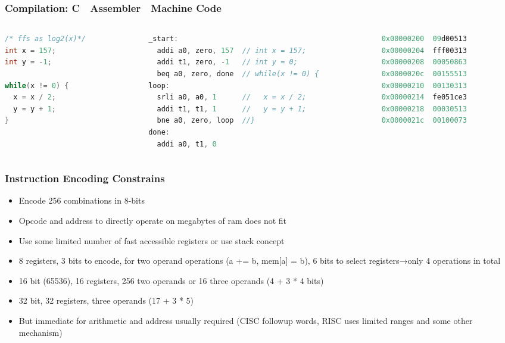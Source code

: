 \documentclass{beamer}
\begin{document}
\begin{frame}[fragile]
\frametitle{Compilation: C  Assembler  Machine Code}

\begin{columns}
\begin{column}{0.3\textwidth}
\begin{lstlisting}[language={C},columns=flexible]
/* ffs as log2(x)*/
int x = 157;
int y = -1;
 
while(x != 0) {
  x = x / 2;
  y = y + 1;
}
\end{lstlisting}
\end{column}

\begin{column}{0.4\textwidth}  
\begin{lstlisting}[language={C},columns=flexible]
_start:
  addi a0, zero, 157  // int x = 157;
  addi t1, zero, -1   // int y = 0;
  beq a0, zero, done  // while(x != 0) {
loop:
  srli a0, a0, 1      //   x = x / 2;
  addi t1, t1, 1      //   y = y + 1;
  bne a0, zero, loop  //}
done:
  addi a0, t1, 0
\end{lstlisting}
\end{column}

\begin{column}{0.3\textwidth}  
\begin{lstlisting}[language={C}]
0x00000200  09d00513
0x00000204  fff00313
0x00000208  00050863
0x0000020c  00155513
0x00000210  00130313
0x00000214  fe051ce3
0x00000218  00030513
0x0000021c  00100073
\end{lstlisting}
\end{column}

\end{columns}

\end{frame}


\begin{frame}
\frametitle{Instruction Encoding Constrains}
\begin{itemize}
\item Encode 256 combinations in 8-bits
\item Opcode and address to directly operate on megabytes of ram does not fit
\item Use some limited number of fast accessible registers or use stack concept
\item 8 registers, 3 bits to encode, for two operand operations (a += b, mem[a] = b), 6 bits to select registers→only 4 operations in total
\item 16 bit (65536), 16 registers, 256 two operands or 16 three operands (4 + 3 * 4 bits)
\item 32 bit, 32 registers, three operands (17 + 3 * 5)
\item But immediate for arithmetic and address usually required (CISC followup words, RISC uses limited ranges and some other mechanism) 
\end{itemize}
\end{frame}
\end{document}
